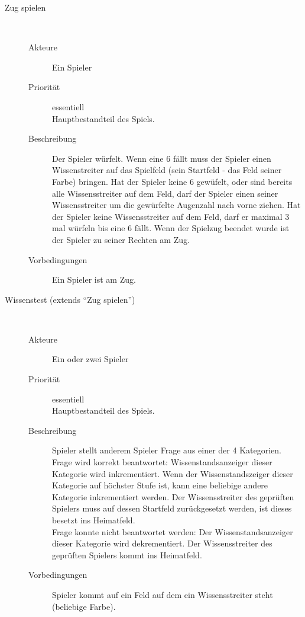 \documentclass{report}
\begin{document}
\begin{description}
   \item[Zug spielen]~\par
   \begin{description}
      \item[Akteure] Ein Spieler
      \item[Priorität] essentiell\\Hauptbestandteil des Spiels.
      \item[Beschreibung] Der Spieler würfelt. Wenn eine 6 fällt muss der Spieler einen Wissenstreiter auf das Spielfeld (sein Startfeld - das Feld seiner Farbe) bringen. Hat der Spieler keine 6 gewüfelt, oder sind bereits alle Wissensstreiter auf dem Feld, darf der Spieler einen seiner Wissensstreiter um die gewürfelte Augenzahl nach vorne ziehen. Hat der Spieler keine Wissensstreiter auf dem Feld, darf er maximal 3 mal würfeln bis eine 6 fällt. Wenn der Spielzug beendet wurde ist der Spieler zu seiner Rechten am Zug.
      \item[Vorbedingungen] Ein Spieler ist am Zug.
   \end{description}


   \item[Wissenstest (extends "`Zug spielen"')]~\par
   \begin{description}
      \item[Akteure] Ein oder zwei Spieler
      \item[Priorität] essentiell\\Hauptbestandteil des Spiels.
      \item[Beschreibung] Spieler stellt anderem Spieler Frage aus einer der 4 Kategorien.\\
Frage wird korrekt beantwortet: Wissenstandsanzeiger dieser Kategorie wird inkrementiert. Wenn der Wissenstandszeiger dieser Kategorie auf höchster Stufe ist, kann eine beliebige andere Kategorie inkrementiert werden. Der Wissensstreiter des geprüften Spielers muss auf dessen Startfeld zurückgesetzt werden, ist dieses besetzt ins Heimatfeld.\\
Frage konnte nicht beantwortet werden: Der Wissenstandsanzeiger dieser Kategorie wird dekrementiert. Der Wissensstreiter des geprüften Spielers kommt ins Heimatfeld.
      \item[Vorbedingungen] Spieler kommt auf ein Feld auf dem ein Wissensstreiter steht (beliebige Farbe).
   \end{description}



\end{description}
\end{document}

